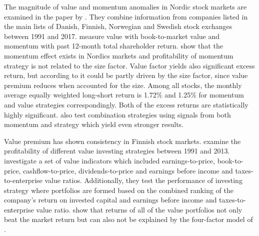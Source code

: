 \documentclass[12pt]{article}
\begin{document}
The magnitude of value and momentum anomalies in Nordic stock markets are examined in the paper by \citet{grobys}. They combine information from companies listed in the main lists of Danish, Finnish, Norwegian and Swedish stock exchanges between 1991 and 2017. \citeauthor{grobys} measure value with book-to-market value and momentum with past 12-month total shareholder return. \citeauthor{grobys} show that the momentum effect exists in Nordics markets and profitability of momentum strategy is not related to the size factor. Value factor yields also significant excess return, but according to \citeauthor{grobys} it could be partly driven by the size factor, since value premium reduces when accounted for the size. Among all stocks, the monthly average equally weighted long-short return is 1.72\% and 1.25\% for momentum and value strategies correspondingly. Both of the excess returns are statistically highly significant. \citeauthor{grobys} also test combination strategies using signals from both momentum and strategy which yield even stronger results. \par

Value premium has shown consistency in Finnish stock markets. \citet*{Davydov2017MagicFV} examine the profitability of different value investing strategies between 1991 and 2013. \citet{Davydov2017MagicFV} investigate a set of value indicators which included earnings-to-price, book-to-price, cashflow-to-price, dividends-to-price and earnings before income and taxes-to-enterprise value ratios. Additionally, they test the performance of investing strategy where portfolios are formed based on the combined ranking of the company's return on invested capital and earnings before income and taxes-to-enterprise value ratio. \citet{Davydov2017MagicFV} show that returns of all of the value portfolios not only beat the market return but can also not be explained by the four-factor model of \citet{Carhart1997}.  \par
\end{document}
